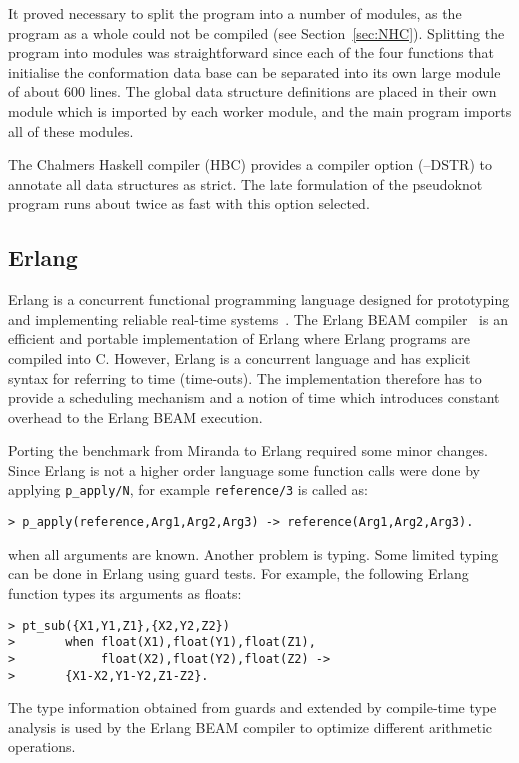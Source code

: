 It proved necessary to split the program into a number of modules, as
the program as a whole could not be compiled (see
Section~\ref{sec:NHC}).  Splitting the program into modules was
straightforward since each of the four functions that initialise the
conformation data base can be separated into its own large module of
about 600 lines.  The global data structure definitions are placed in
their own module which is imported by each worker module, and the main
program imports all of these modules.

The Chalmers Haskell compiler (HBC) provides a compiler option (--DSTR)
to annotate all data structures as strict. The late formulation of the
pseudoknot program runs about twice as fast with this option
selected.

\subsection{Erlang}
Erlang is a concurrent functional programming language designed for
prototyping and implementing reliable real-time systems~\cite{Arm93}.
The Erlang BEAM compiler~\cite{Hau94} is an efficient and portable
implementation of Erlang where Erlang programs are compiled into C.
However, Erlang is a concurrent language and has explicit
syntax for referring to time (time-outs). The implementation therefore
has to provide a scheduling mechanism and a notion of time which
introduces constant overhead to the Erlang BEAM execution.

Porting the benchmark from Miranda to Erlang required some minor changes.
Since Erlang is not a higher order language some function calls were
done by applying \verb=p_apply/N=, for example \verb=reference/3= is
called as:
\begin{verbatim}
> p_apply(reference,Arg1,Arg2,Arg3) -> reference(Arg1,Arg2,Arg3).
\end{verbatim}
when all arguments are known.
Another problem is typing. Some limited typing can be done in Erlang
using guard tests. For example, the following Erlang function types its
arguments as floats:
\begin{verbatim}
> pt_sub({X1,Y1,Z1},{X2,Y2,Z2})
>       when float(X1),float(Y1),float(Z1),
>            float(X2),float(Y2),float(Z2) ->
>       {X1-X2,Y1-Y2,Z1-Z2}.
\end{verbatim}
The type information obtained from guards and extended by compile-time
type analysis is used by the Erlang BEAM compiler to optimize
different arithmetic operations.

